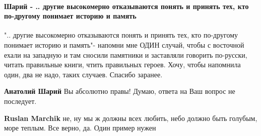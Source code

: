  
 
 
 
 
\paragraph{Шарий - .. другие высокомерно отказываются понять и принять тех, кто по-другому понимает историю и память}
\label{sec:31_07_2021.fb.panchenko_diana.1.oko_za_oko.cmt.sharij_drugie}

\begin{itemize}
 

".. другие высокомерно отказываются понять и принять тех, кто по-другому
понимает историю и память"- напомни мне ОДИН случай, чтобы с восточной ехали на
западную и там сносили памятники и заставляли говорить по-русски, читать
правильные книги, чтить правильных героев. Хочу, чтобы напомнила один, два не
надо, таких случаев. Спасибо заранее.

\begin{itemize}
 
\textbf{Анатолий Шарий} Вы абсолютно правы! Думаю, ответа на Ваш вопрос не последует.

 

\textbf{Ruslan Marchik} не, ну мы ж должны всех любить, небо должно быть голубым, море теплым. Все верно, да. Один пример нужен

 

\end{itemize}
\end{itemize}
